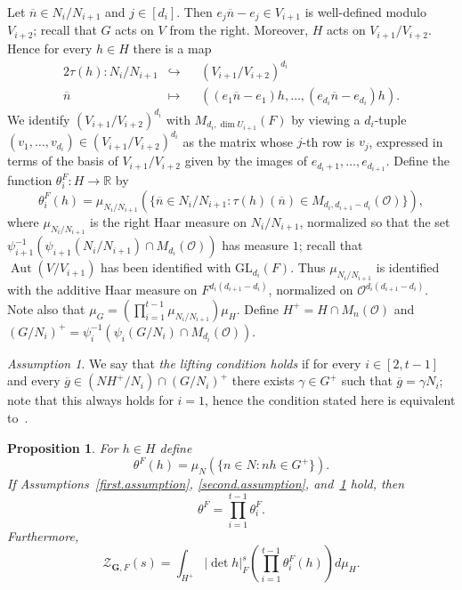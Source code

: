 \documentclass[11pt,a4paper]{amsart}
\theoremstyle{plain}
\newtheorem{pro}[thm]{Proposition}
\theoremstyle{remark}
\newtheorem{asm}[thm]{Assumption}
\DeclareMathOperator{\Aut}{Aut}
\begin{document}
Let $\overline{n} \in N_i/N_{i+1}$ and $j \in [d_i]$.  Then $e_j \overline{n} - e_j \in V_{i+1}$ is well-defined modulo $V_{i+2}$; recall that $G$ acts on $V$ from the right.  Moreover, $H$ acts on $V_{i+1}/V_{i+2}$.  Hence for every $h \in H$ there is a map
\begin{alignat*}{2}
\tau(h) : N_i / N_{i+1} & \hookrightarrow &&(V_{i+1}/V_{i+2})^{d_i} \\
\overline{n} & \mapsto &&((e_1 \overline{n} - e_1)h, \dots, (e_{d_i} \overline{n} - e_{d_i})h).
\end{alignat*}
We identify $(V_{i+1}/V_{i+2})^{d_i}$ with $M_{d_i, \dim U_{i+1}}(F)$ by viewing a $d_i$-tuple $(v_1, \dots, v_{d_i}) \in (V_{i+1}/V_{i+2})^{d_i}$ as the matrix whose $j$-th row is $v_j$, expressed in terms of the basis of $V_{i+1}/V_{i+2}$ given by the images of $e_{d_i + 1}, \dots, e_{d_{i+1}}$.  Define the function $\theta_i^F : H \to \mathbb{R}$ by
\begin{equation} \label{equ:def.theta}
\theta_i^F (h) = \mu_{N_i / N_{i+1}}( \{ \overline{n} \in N_i / N_{i+1} : \tau(h)(\overline{n}) \in M_{d_i, d_{i+1} - d_i}(\mathcal{O}) \} ),
\end{equation}
where $\mu_{N_i / N_{i+1}}$ is the right Haar measure on $N_i / N_{i+1}$, normalized so that the set 
$\psi_{i+1}^{-1}(\psi_{i+1}(N_i / N_{i+1}) \cap M_{d_i}(\mathcal{O}))$ has measure $1$; recall that $\Aut (V / V_{i+1})$ has been identified with $\mathrm{GL}_{d_i}(F)$.  Thus $\mu_{N_i / N_{i+1}}$ is identified with the additive Haar measure on $F^{d_i(d_{i+1}-d_i)}$, normalized on $\mathcal{O}^{d_i(d_{i+1}-d_i)}$.  Note also that $\mu_G = \left( \prod_{i = 1}^{t-1} \mu_{N_i / N_{i+1}} \right) \mu_H$.
Define $H^+ = H \cap M_n(\mathcal{O})$ and $(G/N_{i})^+ = \psi_i^{-1}(\psi_i(G/N_{i}) \cap M_{d_{i}}(\mathcal{O}))$.  

\begin{asm} \label{lifting.condition}
We say that {\emph{the lifting condition holds}} if for every $i \in [2, t-1]$ and every $\overline{g} \in (NH^+ / N_i) \cap (G/N_i)^+$ there exists $\gamma \in G^+$ such that $\overline{g} = \gamma N_i$; note that this always holds for $i = 1$, hence the condition stated here is equivalent to~\cite[Assumption~2.3]{duSLubotzky/96}.
\end{asm}

\begin{pro} \cite[Theorem~2.2]{duSLubotzky/96} \label{pro:duSL}
For $h \in H$ define
$$ \theta^F(h) = \mu_N( \{ n \in N : nh \in G^+ \} ).$$
If Assumptions~\ref{first.assumption}, \ref{second.assumption}, and~\ref{lifting.condition} hold, then 
$$ \theta^F = \prod_{i = 1}^{t-1} \theta_i^F.$$
Furthermore,
$$ \mathcal{Z}_{\mathbf{G}, F}(s) = \int_{H^+} | \det h |_{F}^s \left( \prod_{i = 1}^{t-1} \theta_i^F (h) \right) d \mu_H.$$
\end{pro}
\end{document}
